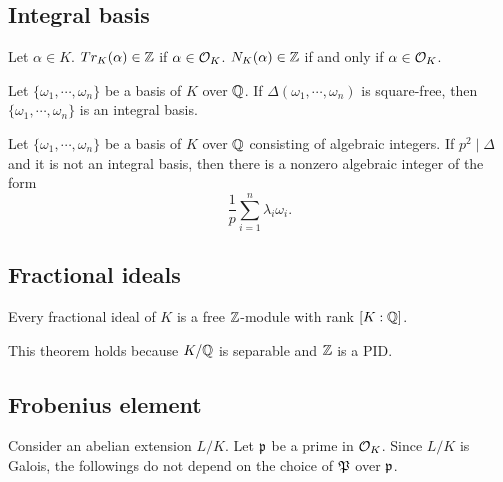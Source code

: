 \documentclass[11pt]{article}
\begin{document}
\subsection{Integral basis}
\begin{thm}
Let $\alpha\in K$.
$Tr_K(\alpha)\in\mathbb{Z}$ if $\alpha\in\mathcal{O}_K$.
$N_K(\alpha)\in\mathbb{Z}$ if and only if $\alpha\in\mathcal{O}_K$.
\end{thm}
\begin{thm}
Let $\{\omega_1,\cdots,\omega_n\}$ be a basis of $K$ over $\mathbb{Q}$.
If $\Delta(\omega_1,\cdots,\omega_n)$ is square-free, then $\{\omega_1,\cdots,\omega_n\}$ is an integral basis.
\end{thm}
\begin{thm}
Let $\{\omega_1,\cdots,\omega_n\}$ be a basis of $K$ over $\mathbb{Q}$ consisting of algebraic integers.
If $p^2\mid\Delta$ and it is not an integral basis, then there is a nonzero algebraic integer of the form
\[\frac1p\sum_{i=1}^n\lambda_i\omega_i.\]
\end{thm}

\subsection{Fractional ideals}
\begin{thm}
Every fractional ideal of $K$ is a free $\mathbb{Z}$-module with rank $[K:\mathbb{Q}]$.
\end{thm}
\begin{pf}
This theorem holds because $K/\mathbb{Q}$ is separable and $\mathbb{Z}$ is a PID.

\end{pf}


\clearpage
\subsection{Frobenius element}
Consider an abelian extension $L/K$.
Let $\mathfrak{p}$ be a prime in $\mathcal{O}_K$.
Since $L/K$ is Galois, the followings do not depend on the choice of $\mathfrak{P}$ over $\mathfrak{p}$.
\end{document}
